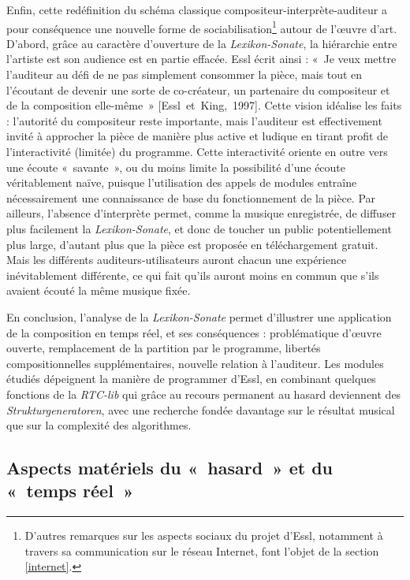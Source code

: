 \documentclass[a4paper,12pt]{article}
\newcommand{\guill}[1]{«~#1~»}
\newcommand{\cicite}[1]{{\footnotesize[#1]}}
\begin{document}
Enfin, cette redéfinition du schéma classique compositeur-interprète-auditeur a pour conséquence une nouvelle forme de sociabilisation\footnote{D'autres remarques sur les aspects sociaux du projet d'Essl, notamment à travers sa communication sur le réseau Internet, font l'objet de la section \ref{internet}.} autour de l'œuvre d'art. D'abord, grâce au caractère d'ouverture de la \emph{Lexikon-Sonate}, la hiérarchie entre l'artiste est son audience est en partie effacée. Essl écrit ainsi : \guill{Je veux mettre l'auditeur au défi de ne pas simplement consommer la pièce, mais tout en l'écoutant de devenir une sorte de co-créateur, un partenaire du compositeur et de la composition elle-même} \cicite{Essl~et~King,~1997}. Cette vision idéalise les faits : l'autorité du compositeur reste importante, mais l'auditeur est effectivement invité à approcher la pièce de manière plus active et ludique en tirant profit de l'interactivité (limitée) du programme. Cette interactivité oriente en outre vers une écoute \guill{savante}, ou du moins limite la possibilité d'une écoute véritablement naïve, puisque l'utilisation des appels de modules entraîne nécessairement une connaissance de base du fonctionnement de la pièce. Par ailleurs, l'absence d'interprète permet, comme la musique enregistrée, de diffuser plus facilement la \emph{Lexikon-Sonate}, et donc de toucher un public potentiellement plus large, d'autant plus que la pièce est proposée en téléchargement gratuit. Mais les différents auditeurs-utilisateurs auront chacun une expérience inévitablement différente, ce qui fait qu'ils auront moins en commun que s'ils avaient écouté la même musique fixée.

En conclusion, l'analyse de la \emph{Lexikon-Sonate} permet d'illustrer une application de la composition en temps réel, et ses conséquences : problématique d'œuvre ouverte, remplacement de la partition par le programme, libertés compositionnelles supplémentaires, nouvelle relation à l'auditeur. Les modules étudiés dépeignent la manière de programmer d'Essl, en combinant quelques fonctions de la \emph{RTC-lib} qui grâce au recours permanent au hasard deviennent des \emph{Strukturgeneratoren}, avec une recherche fondée davantage sur le résultat musical que sur la complexité des algorithmes.


\subsection{Aspects matériels du \guill{hasard} et du \guill{temps réel}}
\label{aspectsmateriels}
\end{document}

